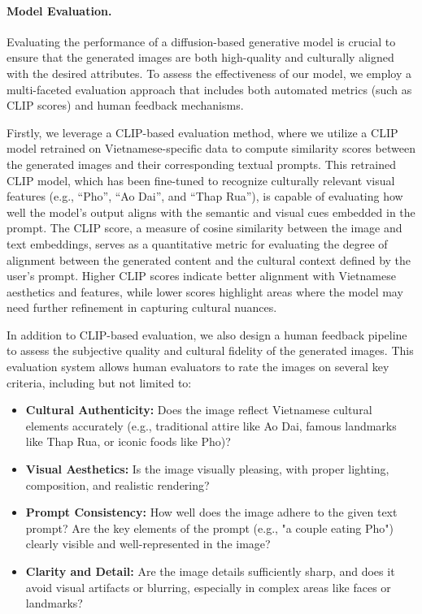 \documentclass[conference]{IEEEtran}
\begin{document}
\paragraph{Model Evaluation.}
Evaluating the performance of a diffusion-based generative model is crucial to ensure that the generated images are both high-quality and culturally aligned with the desired attributes. To assess the effectiveness of our model, we employ a multi-faceted evaluation approach that includes both automated metrics (such as CLIP scores) and human feedback mechanisms.

Firstly, we leverage a CLIP-based evaluation method, where we utilize a CLIP model retrained on Vietnamese-specific data to compute similarity scores between the generated images and their corresponding textual prompts. This retrained CLIP model, which has been fine-tuned to recognize culturally relevant visual features (e.g., ``Pho'', ``Ao Dai'', and ``Thap Rua''), is capable of evaluating how well the model's output aligns with the semantic and visual cues embedded in the prompt. The CLIP score, a measure of cosine similarity between the image and text embeddings, serves as a quantitative metric for evaluating the degree of alignment between the generated content and the cultural context defined by the user’s prompt. Higher CLIP scores indicate better alignment with Vietnamese aesthetics and features, while lower scores highlight areas where the model may need further refinement in capturing cultural nuances.

In addition to CLIP-based evaluation, we also design a human feedback pipeline to assess the subjective quality and cultural fidelity of the generated images. This evaluation system allows human evaluators to rate the images on several key criteria, including but not limited to:
\begin{itemize}
	\item \textbf{Cultural Authenticity:} Does the image reflect Vietnamese cultural elements accurately (e.g., traditional attire like Ao Dai, famous landmarks like Thap Rua, or iconic foods like Pho)?
	\item \textbf{Visual Aesthetics:} Is the image visually pleasing, with proper lighting, composition, and realistic rendering?
	\item \textbf{Prompt Consistency:} How well does the image adhere to the given text prompt? Are the key elements of the prompt (e.g., "a couple eating Pho") clearly visible and well-represented in the image?
	\item \textbf{Clarity and Detail:} Are the image details sufficiently sharp, and does it avoid visual artifacts or blurring, especially in complex areas like faces or landmarks?
\end{itemize}
\end{document}

